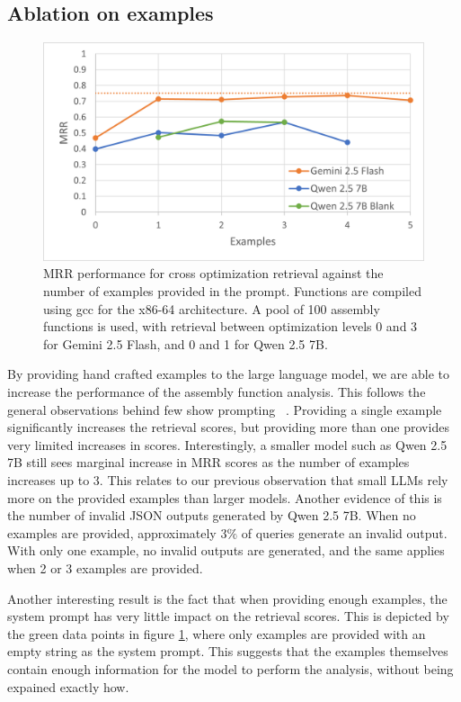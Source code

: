 \subsection{Ablation on examples}

\begin{figure}[]
\centerline{\includegraphics[width=\linewidth]{examples-ablation}}
\caption{MRR performance for cross optimization retrieval against the number of examples provided in the prompt. Functions are compiled
using gcc for the x86-64 architecture. A pool of 100 assembly functions is used, with retrieval between optimization levels 0 and 3
for Gemini 2.5 Flash, and 0 and 1 for Qwen 2.5 7B.}
\label{ex-abl}
\end{figure}

By providing hand crafted examples to the large language model, we are able to increase the performance of the assembly function analysis.
This follows the general observations behind few show prompting ~\cite{few-shot}. Providing a single example significantly increases the retrieval
scores, but providing more than one provides very limited increases in scores. Interestingly, a smaller model such as Qwen 2.5 7B still sees
marginal increase in MRR scores as the number of examples increases up to 3. This relates to our previous observation
that small LLMs rely more on the provided examples than larger models. Another evidence of this is the number of invalid JSON outputs generated by
Qwen 2.5 7B. When no examples are provided, approximately \(3\%\) of queries generate an invalid output. With only one example, no invalid
outputs are generated, and the same applies when 2 or 3 examples are provided.

Another interesting result is the fact that when providing enough examples, the system prompt has very little impact on the retrieval scores.
This is depicted by the green data points in figure \ref{ex-abl}, where only examples are provided with an empty string as the system prompt.
This suggests that the examples themselves contain enough information for the model to perform the analysis, without being expained 
exactly how.

